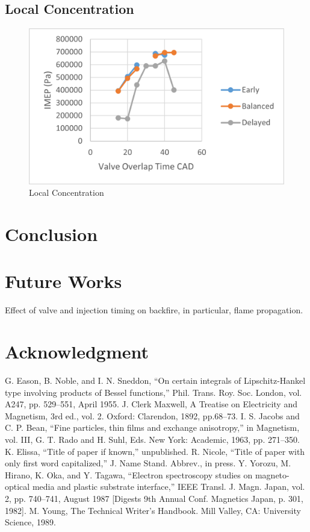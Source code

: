 \documentclass[conference]{IEEEtran}
\begin{document}
\subsection{Local Concentration}
\begin{figure}[htbp]
    \centerline{\includegraphics{Plots/imep.png}}
    \caption{Local Concentration}
    \label{plt_7}
    \end{figure}

\section{Conclusion}

\section{Future Works}
Effect of valve and injection timing on backfire, in particular, flame propagation.

\section*{Acknowledgment}



\begin{thebibliography}{00}
 G. Eason, B. Noble, and I. N. Sneddon, ``On certain integrals of Lipschitz-Hankel type involving products of Bessel functions,'' Phil. Trans. Roy. Soc. London, vol. A247, pp. 529--551, April 1955.
 J. Clerk Maxwell, A Treatise on Electricity and Magnetism, 3rd ed., vol. 2. Oxford: Clarendon, 1892, pp.68--73.
 I. S. Jacobs and C. P. Bean, ``Fine particles, thin films and exchange anisotropy,'' in Magnetism, vol. III, G. T. Rado and H. Suhl, Eds. New York: Academic, 1963, pp. 271--350.
 K. Elissa, ``Title of paper if known,'' unpublished.
 R. Nicole, ``Title of paper with only first word capitalized,'' J. Name Stand. Abbrev., in press.
 Y. Yorozu, M. Hirano, K. Oka, and Y. Tagawa, ``Electron spectroscopy studies on magneto-optical media and plastic substrate interface,'' IEEE Transl. J. Magn. Japan, vol. 2, pp. 740--741, August 1987 [Digests 9th Annual Conf. Magnetics Japan, p. 301, 1982].
 M. Young, The Technical Writer's Handbook. Mill Valley, CA: University Science, 1989.
\end{thebibliography}
\end{document}
